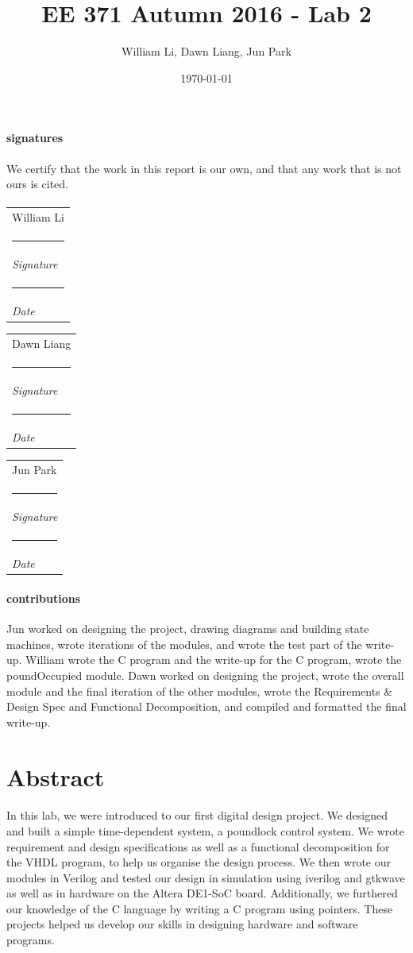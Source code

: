 \documentclass{article}
\title{EE 371 Autumn 2016 - Lab 2}
\date{\today}
\author{William Li, Dawn Liang, Jun Park}
\begin{document}
\newcommand{\namesigdate}[2][5cm]{
  \begin{tabular}{@{}p{#1}@{}}
    #2 \\[2\normalbaselineskip] \hrule \\[0pt]
    {\small \textit{Signature}} \\[2\normalbaselineskip] \hrule \\[0pt]
    {\small \textit{Date}}
  \end{tabular}
}

\maketitle
\newpage

\paragraph{signatures} We certify that the work in this report is our own, and that any work that is not ours is cited.
\paragraph{} \noindent \namesigdate{William Li} \hfill \namesigdate{Dawn Liang} \hfill \namesigdate{Jun Park}
\paragraph{contributions} Jun worked on designing the project, drawing diagrams and building state machines, wrote iterations of the modules, and wrote the test part of the write-up. William wrote the C program and the write-up for the C program, wrote the poundOccupied module. Dawn worked on designing the project, wrote the overall module and the final iteration of the other modules, wrote the Requirements \& Design Spec and Functional Decomposition, and compiled and formatted the final write-up.
\newpage

\tableofcontents
\newpage


\section{Abstract}
\paragraph{} In this lab, we were introduced to our first digital design project. We designed and built a simple time-dependent system, a poundlock control system. We wrote requirement and design specifications as well as a functional decomposition for the VHDL program, to help us organise the design process. We then wrote our modules in Verilog and tested our design in simulation using iverilog and gtkwave as well as in hardware on the Altera DE1-SoC board. Additionally, we furthered our knowledge of the C language by writing a C program using pointers. These projects helped us develop our skills in designing hardware and software programs.
\end{document}
